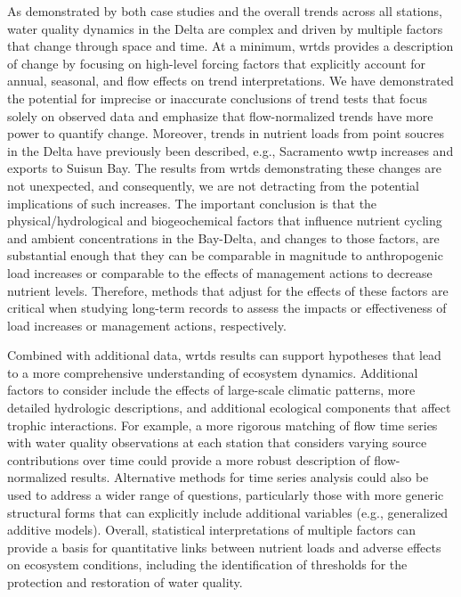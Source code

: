 \documentclass[journal = esthag, manuscript = article]{achemso}\usepackage[]{graphicx}\usepackage[]{color}
\begin{document}
As demonstrated by both case studies and the overall trends across all stations, water quality dynamics in the Delta are complex and driven by multiple factors that change through space and time.  At a minimum, \ac{wrtds} provides a description of change by focusing on high-level forcing factors that explicitly account for annual, seasonal, and flow effects on trend interpretations.  We have demonstrated the potential for imprecise or inaccurate conclusions of trend tests that focus solely on observed data and emphasize that flow-normalized trends have more power to quantify change.  Moreover, trends in nutrient loads from point soucres in the Delta have previously been described, e.g., Sacramento \ac{wwtp} increases\cite{Jassby08} and exports to Suisun Bay\cite{Novick14}. The results from \ac{wrtds} demonstrating these changes are not unexpected, and consequently, we are not detracting from the potential implications of such increases. The important conclusion is that the physical/hydrological and biogeochemical factors that influence nutrient cycling and ambient concentrations in the Bay-Delta, and changes to those factors, are substantial enough that they can be comparable in magnitude to anthropogenic load increases or comparable to the effects of management actions to decrease nutrient levels. Therefore, methods that adjust for the effects of these factors are critical when studying long-term records to assess the impacts or effectiveness of load increases or management actions, respectively.

Combined with additional data, \ac{wrtds} results can support hypotheses that lead to a more comprehensive understanding of ecosystem dynamics. Additional factors to consider include the effects of large-scale climatic patterns, more detailed hydrologic descriptions, and additional ecological components that affect trophic interactions.  For example, a more rigorous matching of flow time series with water quality observations at each station that considers varying source contributions over time could provide a more robust description of flow-normalized results.  Alternative methods for time series analysis could also be used to address a wider range of questions, particularly those with more generic structural forms that can explicitly include additional variables (e.g., generalized additive models).\cite{Beck17}  Overall, statistical interpretations of multiple factors can provide a basis for quantitative links between nutrient loads and adverse effects on ecosystem conditions, including the identification of thresholds for the protection and restoration of water quality. 
\end{document}
